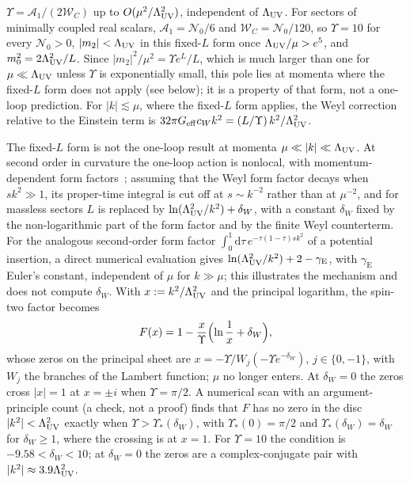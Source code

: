 \(\Upsilon=\mathcal A_1/(2\mathcal W_C)\) up to \(O(\mu^2/\Lambda_{\mathrm{UV}}^2)\),
independent of \(\Lambda_{\mathrm{UV}}\). For sectors of minimally coupled real scalars,
\(\mathcal A_1=\mathcal N_0/6\) and \(\mathcal W_C=\mathcal N_0/120\), so
\(\Upsilon=10\) for every \(\mathcal N_0>0\),
\(|m_2|<\Lambda_{\mathrm{UV}}\) in this fixed-\(L\) form once \(\Lambda_{\mathrm{UV}}/\mu>e^{5}\), and
\(m_0^2=2\Lambda_{\mathrm{UV}}^2/L\). Since \(|m_2|^2/\mu^2=\Upsilon e^{L}/L\), which is
much larger than one for \(\mu\ll\Lambda_{\mathrm{UV}}\) unless \(\Upsilon\) is
exponentially small, this pole lies at momenta where the fixed-\(L\)
form does not apply (see below); it is a property of that form, not a
one-loop prediction. For \(|k|\lesssim\mu\), where the fixed-\(L\) form
applies, the Weyl correction relative to the Einstein term is
\(32\pi G_{\mathrm{eff}}c_Wk^2=(L/\Upsilon)\,k^2/\Lambda_{\mathrm{UV}}^2\).

The fixed-\(L\) form is not the one-loop result at momenta
\(\mu\ll|k|\ll\Lambda_{\mathrm{UV}}\). At second order in curvature the one-loop action
is nonlocal, with momentum-dependent form factors~\cite{BarvinskyVilkovisky1990}; assuming that
the Weyl form factor decays when \(sk^2\gg1\), its proper-time integral
is cut off at \(s\sim k^{-2}\) rather than at \(\mu^{-2}\), and for
massless sectors \(L\) is replaced by \(\ln(\Lambda_{\mathrm{UV}}^2/k^2)+\delta_W\), with
a constant \(\delta_W\) fixed by the non-logarithmic part of the form
factor and by the finite Weyl counterterm. For the analogous
second-order form factor \(\int_0^1\mathrm d\tau\,
e^{-\tau(1-\tau)sk^2}\) of a potential insertion, a direct
numerical evaluation gives \(\ln(\Lambda_{\mathrm{UV}}^2/k^2)+2-\gamma_{\mathrm E}\),
with \(\gamma_{\mathrm E}\) Euler's constant,
independent of \(\mu\) for \(k\gg\mu\); this illustrates the mechanism
and does not compute \(\delta_W\). With \(x:=k^2/\Lambda_{\mathrm{UV}}^2\) and the
principal logarithm, the spin-two factor becomes
\[
  F(x)=1-\frac{x}{\Upsilon}\Bigl(\ln\frac1x+\delta_W\Bigr),
\]
whose zeros on the principal sheet are
\(x=-\Upsilon/W_j(-\Upsilon e^{-\delta_W})\), \(j\in\{0,-1\}\), with
\(W_j\) the branches of the Lambert function; \(\mu\) no longer enters.
At \(\delta_W=0\) the zeros cross \(|x|=1\) at \(x=\pm i\) when
\(\Upsilon=\pi/2\). A numerical scan with an argument-principle count
(a check, not a proof) finds that \(F\) has no zero in the disc
\(|k^2|<\Lambda_{\mathrm{UV}}^2\) exactly when \(\Upsilon>\Upsilon_*(\delta_W)\), with
\(\Upsilon_*(0)=\pi/2\) and \(\Upsilon_*(\delta_W)=\delta_W\) for
\(\delta_W\ge1\), where the crossing is at \(x=1\). For \(\Upsilon=10\)
the condition is \(-9.58<\delta_W<10\); at \(\delta_W=0\) the zeros
are a complex-conjugate pair with \(|k^2|\approx3.9\Lambda_{\mathrm{UV}}^2\).

